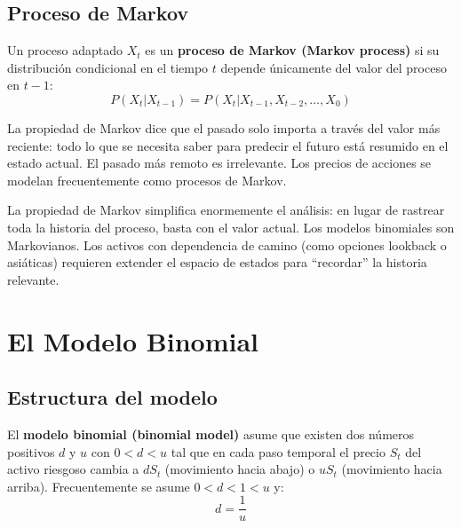 \documentclass[12pt]{article}
\begin{document}
\subsection{Proceso de Markov}

Un proceso adaptado $X_t$ es un \textbf{proceso de Markov (Markov process)} si su distribuci\'on condicional en el tiempo $t$ depende \'unicamente del valor del proceso en $t-1$:
\begin{equation}
    P(X_t | X_{t-1}) = P(X_t | X_{t-1}, X_{t-2}, \ldots, X_0)
\end{equation}

\begin{intuicionmat}
La propiedad de Markov dice que el pasado solo importa a trav\'es del valor m\'as reciente: todo lo que se necesita saber para predecir el futuro est\'a resumido en el estado actual. El pasado m\'as remoto es irrelevante. Los precios de acciones se modelan frecuentemente como procesos de Markov.
\end{intuicionmat}

\begin{intuicion}
La propiedad de Markov simplifica enormemente el an\'alisis: en lugar de rastrear toda la historia del proceso, basta con el valor actual. Los modelos binomiales son Markovianos. Los activos con dependencia de camino (como opciones lookback o asi\'aticas) requieren extender el espacio de estados para ``recordar'' la historia relevante.
\end{intuicion}

\section{El Modelo Binomial}

\subsection{Estructura del modelo}

El \textbf{modelo binomial (binomial model)} asume que existen dos n\'umeros positivos $d$ y $u$ con $0 < d < u$ tal que en cada paso temporal el precio $S_t$ del activo riesgoso cambia a $dS_t$ (movimiento hacia abajo) o $uS_t$ (movimiento hacia arriba). Frecuentemente se asume $0 < d < 1 < u$ y:
\begin{equation}
    d = \frac{1}{u}
\end{equation}
\end{document}
